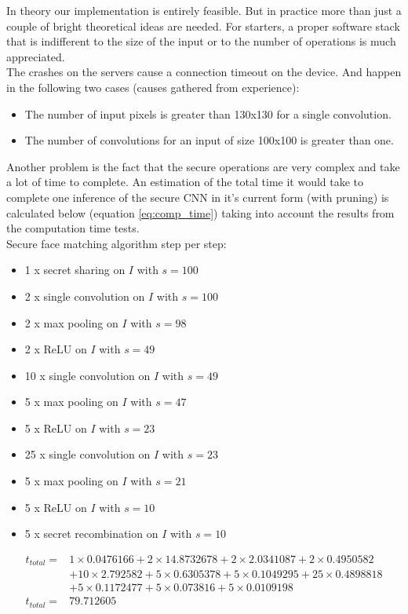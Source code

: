 In theory our implementation is entirely feasible. But in practice more than just a couple of bright theoretical ideas are needed. For starters, a proper software stack that is indifferent to the size of the input or to the number of operations is much appreciated.\\

The crashes on the servers cause a connection timeout on the device. And happen in the following two cases (causes gathered from experience):

\begin{itemize}
  \item The number of input pixels is greater than 130x130 for a single convolution.
  \item The number of convolutions for an input of size 100x100 is greater than one.
\end{itemize}

Another problem is the fact that the secure operations are very complex and take a lot of time to complete. An estimation of the total time it would take to complete one inference of the secure CNN in it's current form (with pruning) is calculated below (equation \ref{eq:comp_time}) taking into account the results from the computation time tests.\\

Secure face matching algorithm step per step:
\begin{itemize}
  \item 1 x secret sharing on $I$ with $s=100$
  \item 2 x single convolution on $I$ with $s=100$
  \item 2 x max pooling on $I$ with $s=98$
  \item 2 x ReLU on $I$ with $s=49$
  \item 10 x single convolution on $I$ with $s=49$
  \item 5 x max pooling on $I$ with $s=47$
  \item 5 x ReLU on $I$ with $s=23$
  \item 25 x single convolution on $I$ with $s=23$
  \item 5 x max pooling on $I$ with $s=21$
  \item 5 x ReLU on $I$ with $s=10$
  \item 5 x secret recombination on $I$ with $s=10$
\end{itemize}

\begin{equation} \label{eq:comp_time}
  \begin{aligned}
      t_{total} = & 1\times0.0476166 + 2\times14.8732678 + 2\times2.0341087 + 2\times0.4950582\\
                & + 10\times2.792582 + 5\times0.6305378 + 5\times0.1049295 + 25\times0.4898818\\
                & + 5\times0.1172477 + 5\times0.073816 + 5\times 0.0109198\\
      t_{total} = & 79.712605
  \end{aligned}
\end{equation}

